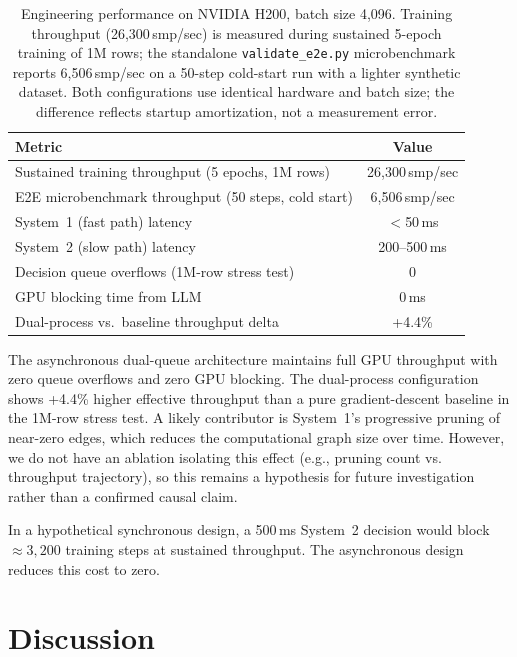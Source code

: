 \documentclass[11pt,a4paper]{article}
\begin{document}
\begin{table}[ht]
\centering
\caption{Engineering performance on NVIDIA H200, batch size 4,096. Training throughput
(26,300\,smp/sec) is measured during sustained 5-epoch training of 1M rows; the
standalone \texttt{validate\_e2e.py} microbenchmark reports 6,506\,smp/sec on a 50-step
cold-start run with a lighter synthetic dataset. Both configurations use identical
hardware and batch size; the difference reflects startup amortization, not a
measurement error.}
\begin{tabular}{@{}lc@{}}
\toprule
Metric & Value \\ \midrule
Sustained training throughput (5 epochs, 1M rows) & 26,300\,smp/sec \\
E2E microbenchmark throughput (50 steps, cold start) & 6,506\,smp/sec \\
System~1 (fast path) latency & $<$50\,ms \\
System~2 (slow path) latency & 200--500\,ms \\
Decision queue overflows (1M-row stress test) & 0 \\
GPU blocking time from LLM & 0\,ms \\
Dual-process vs.\ baseline throughput delta & +4.4\% \\
\bottomrule
\end{tabular}
\label{tab:engineering}
\end{table}

The asynchronous dual-queue architecture maintains full GPU throughput with zero queue
overflows and zero GPU blocking. The dual-process configuration shows +4.4\% higher
effective throughput than a pure gradient-descent baseline in the 1M-row stress test.
A likely contributor is System~1's progressive pruning of near-zero edges, which
reduces the computational graph size over time. However, we do not have an ablation
isolating this effect (e.g., pruning count vs. throughput trajectory), so this remains
a hypothesis for future investigation rather than a confirmed causal claim.

In a hypothetical synchronous design, a 500\,ms System~2 decision would block
$\approx 3{,}200$ training steps at sustained throughput. The asynchronous design
reduces this cost to zero.

\section{Discussion}
\label{sec:discussion}
\end{document}
